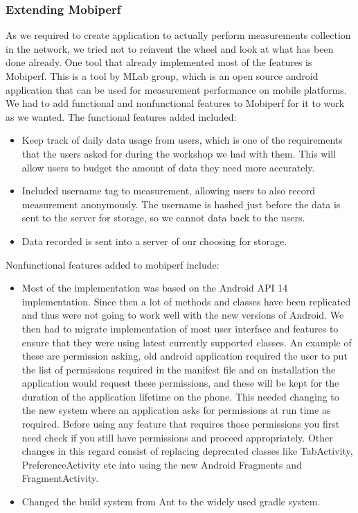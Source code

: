 \subsubsection{Extending Mobiperf}
As we required to create application to actually perform measurements collection in the network, we tried not to reinvent the wheel and look at what has been done already.
One tool that already implemented most of the features is Mobiperf\cite{mobiperf}.
This is a tool by MLab group, which is an open source android application that can be used for measurement performance on mobile platforms\cite{mobiperf}.
We had to add functional and nonfunctional features to Mobiperf for it to work as we wanted.
The functional features added included:
\begin{itemize}
    \item Keep track of daily data usage from users, which is one of the requirements that the users asked for during the workshop we had with them.
    This will allow users to budget the amount of data they need more accurately.
    \item Included username tag to measurement, allowing users to also record measurement anonymously.
    The username is hashed just before the data is sent to the server for storage, so we cannot data back to the users.
    \item Data recorded is sent into a server of our choosing for storage.
\end{itemize}
Nonfunctional features added to mobiperf include:
\begin{itemize}
    \item Most of the implementation was based on the Android API 14 implementation.
    Since then a lot of methods and classes have been replicated and thus were not going to work well with the new versions of Android.
    We then had to migrate implementation of most user interface and features to ensure that they were using latest currently supported classes.
    An example of these are permission asking, old android application required the user to put the list of permissions required in the manifest file and on installation the application would request these permissions, and these will be kept for the duration of the application lifetime on the phone.
    This needed changing to the new system where an application asks for permissions at run time as required.
    Before using any feature that requires those permissions you first need check if you still have permissions and proceed appropriately.
    Other changes in this regard consist of replacing deprecated classes like TabActivity, PreferenceActivity etc into using the new Android Fragments and FragmentActivity.
    \item Changed the build system from Ant to the widely used gradle system.
\end{itemize}
